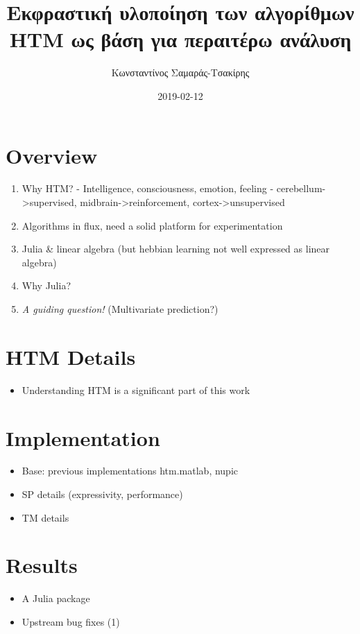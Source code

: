 \documentclass[a4paper,10pt]{article}
\title{Εκφραστική υλοποίηση των αλγορίθμων HTM ως βάση για περαιτέρω ανάλυση}
\author{Κωνσταντίνος Σαμαράς-Τσακίρης}
\date{2019-02-12}
\begin{document}
\maketitle

\section{Overview}
\begin{enumerate}
  \item Why HTM?
  - Intelligence, consciousness, emotion, feeling
  - {cerebellum->supervised, midbrain->reinforcement, cortex->unsupervised}
  \item Algorithms in flux, need a solid platform for experimentation
  \item Julia \& linear algebra (but hebbian learning not well expressed as linear algebra)
  \item Why Julia?
  \item \textit{A guiding question!} (Multivariate prediction?)
\end{enumerate}

\section{HTM Details}
\begin{itemize}
  \item Understanding HTM is a significant part of this work
\end{itemize}

\section{Implementation}
\begin{itemize}
  \item Base: previous implementations {htm.matlab, nupic}
  \item SP details (expressivity, performance)
  \item TM details
\end{itemize}

\section{Results}
\begin{itemize}
  \item A Julia package
  \item Upstream bug fixes (1)
\end{itemize}
\end{document}
